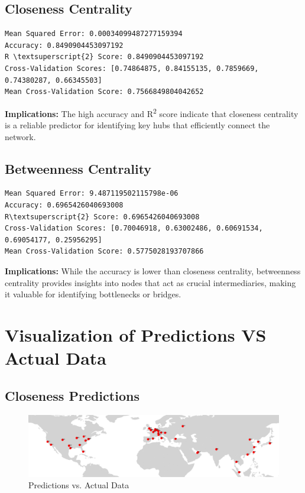 \documentclass[12pt]{article}
\begin{document}
\subsection*{Closeness Centrality}
\begin{verbatim}
Mean Squared Error: 0.00034099487277159394
Accuracy: 0.8490904453097192
R \textsuperscript{2} Score: 0.8490904453097192
Cross-Validation Scores: [0.74864875, 0.84155135, 0.7859669, 0.74380287, 0.66345503]
Mean Cross-Validation Score: 0.7566849804042652
\end{verbatim}
\textbf{Implications:} The high accuracy and R\textsuperscript{2} score indicate that closeness centrality is a reliable predictor for identifying key hubs that efficiently connect the network.

\subsection*{Betweenness Centrality}
\begin{verbatim}
Mean Squared Error: 9.487119502115798e-06
Accuracy: 0.6965426040693008
R\textsuperscript{2} Score: 0.6965426040693008
Cross-Validation Scores: [0.70046918, 0.63002486, 0.60691534, 0.69054177, 0.25956295]
Mean Cross-Validation Score: 0.5775028193707866
\end{verbatim}
\textbf{Implications:} While the accuracy is lower than closeness centrality, betweenness centrality provides insights into nodes that act as crucial intermediaries, making it valuable for identifying bottlenecks or bridges.

\section{Visualization of Predictions VS Actual Data}
\subsection*{Closeness Predictions}
\begin{figure}[h!]
	\centering
	\includegraphics[width=1\textwidth]{figures/c_pred.png}
	\caption{Predictions vs. Actual Data}
	\label{fig:closeness_predictions}
\end{figure}
\end{document}
